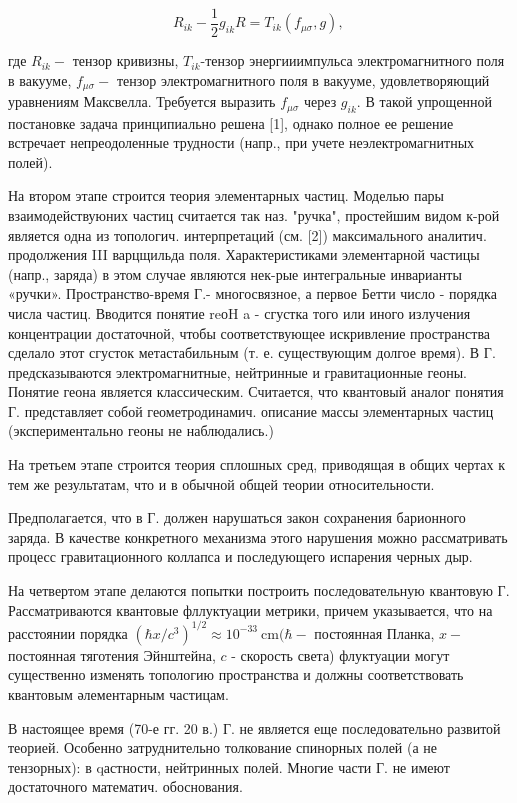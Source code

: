 \documentclass[10pt]{article}
\begin{document}
\[

R_{i k}-\frac{1}{2} g_{i k} R=T_{i k}\left(f_{\mu \sigma}, g\right) \text {, }

\]



где $R_{i k}-$ тензор кривизны, $T_{i k}$-тензор энергииимпульса электромагнитного поля в вакууме, $f_{\mu \sigma}-$ тензор электромагнитного поля в вакууме, удовлетворяющий уравнениям Максвелла. Требуется выразить $f_{\mu \sigma}$ через $g_{i k}$. В такой упрощенной постановке задача принципиально решена [1], однако полное ее решение встречает непреодоленные трудности (напр., при учете неэлектромагнитных полей).



На втором этапе строится теория элементарных частиц. Моделью пары взаимодействуюних частиц считается так наз. "ручка", простейшим видом к-рой является одна из топологич. интерпретаций (см. [2]) максимального аналитич. продолжения III варцщильда поля. Характеристиками элементарной частицы (напр., заряда) в этом случае являются нек-рые интегральные инварианты «ручки». Пространство-время Г.- многосвязное, а первое Бетти число - порядка числа частиц. Вводится понятие $\mathrm{r} \mathrm{e} о \mathrm{H}$ a - сгустка того или иного излучения концентрации достаточной, чтобы соответствующее искривление пространства сделало этот сгусток метастабильным (т. е. существующим долгое время). В Г. предсказываются электромагнитные, нейтринные и гравитационные геоны. Понятие геона является классическим. Считается, что квантовый аналог понятия Г. представляет собой геометродинамич. описание массы элементарных частиц (экспериментально геоны не наблюдались.)



На третьем этапе строится теория сплошных сред, приводящая в общих чертах к тем же результатам, что и в обычной общей теории относительности.



Предполагается, что в Г. должен нарушаться закон сохранения барионного заряда. В качестве конкретного механизма этого нарушения можно рассматривать процесс гравитационного коллапса и последующего испарения черных дыр.



На четвертом этапе делаются попытки построить последовательную квантовую Г. Рассматриваются квантовые фллуктуации метрики, причем указывается, что на расстоянии порядка $\left(\hbar x / c^{3}\right)^{1 / 2} \approx 10^{-33} \mathrm{~cm}(\hbar-$ постоянная Планка, $x-$ постоянная тяготения Эйнштейна, $c$ - скорость света) флуктуации могут существенно изменять топологию пространства и должны соответствовать квантовым әлементарным частицам.



В настоящее время (70-е гг. 20 в.) Г. не является еще последовательно развитой теорией. Особенно затруднительно толкование спинорных полей (а не тензорных): в qастности, нейтринных полей. Многие части Г. не имеют достаточного математич. обоснования.
\end{document}
